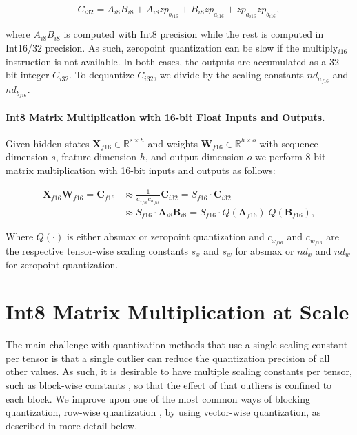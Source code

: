 \begin{equation}
C_{i32}= {A}_{i8}{B}_{i8} + {A}_{i8}zp_{b_{i16}} + {B}_{i8}zp_{a_{i16}} + zp_{a_{i16}}zp_{b_{i16}},
\end{equation}

where $A_{i8}B_{i8}$ is computed with Int8 precision while the rest is computed in Int16/32 precision. As such, zeropoint quantization can be slow if the multiply$_{i16}$ instruction is not available. In both cases, the outputs are accumulated as a 32-bit integer $C_{i32}$. To dequantize $C_{i32}$, we divide by the scaling constants $nd_{a_{f16}}$ and $nd_{b_{f16}}$.

\paragraph{Int8 Matrix Multiplication with 16-bit Float Inputs and Outputs.}

Given hidden states ${\mathbf{X}_{f16}\in \mathbb{R}^{s\times h}}$ and weights $\mathbf{W}_{f16}\in \mathbb{R}^{h\times o}$ with sequence dimension $s$, feature dimension $h$, and output dimension $o$ we perform 8-bit matrix multiplication with 16-bit inputs and outputs as follows:

\begin{equation}
\begin{split}
    \mathbf{X}_{f16} \mathbf{W}_{f16} =\mathbf{C}_{f16}  & \approx \frac{1}{c_{x_{f16}}c_{w_{f16}}} \mathbf{C}_{i32} = S_{f16}\cdot\mathbf{C}_{i32}\\
    & \approx S_{f16}\cdot\mathbf{A}_{i8}\mathbf{B}_{i8} = S_{f16}\cdot Q(\mathbf{A}_{f16})\phantom{.} Q(\mathbf{B}_{f16}),
\end{split}
\end{equation}

Where $Q(\cdot)$ is either absmax or zeropoint quantization and $c_{x_{f16}}$ and $c_{w_{f16}}$ are the respective tensor-wise scaling constants $s_x$ and $s_w$ for absmax or $nd_x$ and $nd_w$ for zeropoint quantization.

\section{Int8 Matrix Multiplication at Scale}
\label{sec:matmulatscale}

The main challenge with quantization methods that use a single scaling constant per tensor is that a single outlier can reduce the quantization precision of all other values. As such, it is desirable to have multiple scaling constants per tensor, such as block-wise constants \citep{dettmers2022optimizers}, so that the effect of that outliers is confined to each block. We improve upon one of the most common ways of blocking quantization, row-wise quantization \citep{fbgemm}, by using vector-wise quantization, as described in more detail below.

